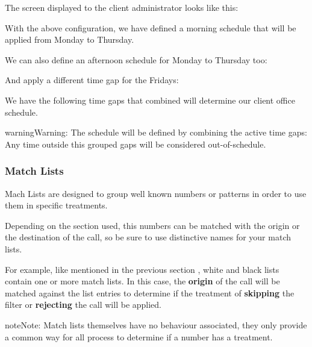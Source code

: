 \documentclass[letterpaper,10pt,english]{sphinxmanual}
\begin{document}
The screen displayed to the client administrator looks like this:

With the above configuration, we have defined a morning schedule that will be
applied from Monday to Thursday.

We can also define an afternoon schedule for Monday to Thursday too:

And apply a different time gap for the Fridays:

We have the following time gaps that combined will determine our client
office schedule.

\begin{notice}{warning}{Warning:}
The schedule will be defined by combining the active time gaps:
Any time outside this grouped gaps will be considered out-of-schedule.
\end{notice}
\label{administration_portal/client/vpbx/routing_tools/match_lists:match-lists}

\subsubsection{Match Lists}
\label{administration_portal/client/vpbx/routing_tools/match_lists:match-lists}\label{administration_portal/client/vpbx/routing_tools/match_lists:id2}\label{administration_portal/client/vpbx/routing_tools/match_lists::doc}\label{administration_portal/client/vpbx/routing_tools/match_lists:id1}
Mach Lists are designed to group well known numbers or patterns in order to use
them in specific treatments.

Depending on the section used, this numbers can be matched with the origin or
the destination of the call, so be sure to use distinctive names for your match
lists.

For example, like mentioned in the previous section {\hyperref[administration_portal/client/vpbx/routing_tools/external_call_filters:external\string-filters]{}},
white and black lists contain one or more match lists. In this case, the
\textbf{origin} of the call will be matched against the list entries to determine if
the treatment of \textbf{skipping} the filter or \textbf{rejecting} the call will be applied.

\begin{notice}{note}{Note:}
Match lists themselves have no behaviour associated, they only provide
a common way for all process to determine if a number has a treatment.
\end{notice}
\end{document}
